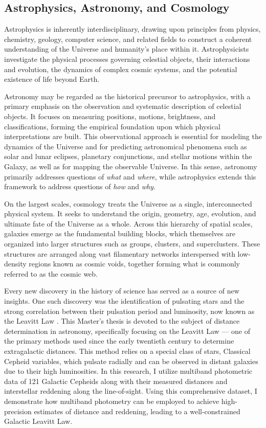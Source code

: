 \cite{2009MNRAS.396.1287S}


\subsection{Astrophysics, Astronomy, and Cosmology}

Astrophysics is inherently interdisciplinary, drawing upon principles from physics, chemistry, geology, computer science, and related fields to construct a coherent understanding of the Universe and humanity’s place within it. Astrophysicists investigate the physical processes governing celestial objects, their interactions and evolution, the dynamics of complex cosmic systems, and the potential existence of life beyond Earth.

Astronomy may be regarded as the historical precursor to astrophysics, with a primary emphasis on the observation and systematic description of celestial objects. It focuses on measuring positions, motions, brightness, and classifications, forming the empirical foundation upon which physical interpretations are built. This observational approach is essential for modeling the dynamics of the Universe and for predicting astronomical phenomena such as solar and lunar eclipses, planetary conjunctions, and stellar motions within the Galaxy, as well as for mapping the observable Universe. In this sense, astronomy primarily addresses questions of \emph{what} and \emph{where}, while astrophysics extends this framework to address questions of \emph{how} and \emph{why}.

On the largest scales, cosmology treats the Universe as a single, interconnected physical system. It seeks to understand the origin, geometry, age, evolution, and ultimate fate of the Universe as a whole. Across this hierarchy of spatial scales, galaxies emerge as the fundamental building blocks, which themselves are organized into larger structures such as groups, clusters, and superclusters. These structures are arranged along vast filamentary networks interspersed with low-density regions known as cosmic voids, together forming what is commonly referred to as the cosmic web.



Every new discovery in the history of science has served as a source of new insights. One such discovery was the identification of pulsating stars and the strong correlation between their pulsation period and luminosity, now known as the Leavitt Law \citep{1908leavitt}. This Master’s thesis is devoted to the subject of distance determination in astronomy, specifically focusing on the Leavitt Law — one of the primary methods used since the early twentieth century to determine extragalactic distances. This method relies on a special class of stars, Classical Cepheid variables, which pulsate radially and can be observed in distant galaxies due to their high luminosities. In this research, I utilize multiband photometric data of 121 Galactic Cepheids along with their measured distances and interstellar reddening along the line-of-sight. Using this comprehensive dataset, I demonstrate how multiband photometry can be employed to achieve high-precision estimates of distance and reddening, leading to a well-constrained Galactic Leavitt Law.

